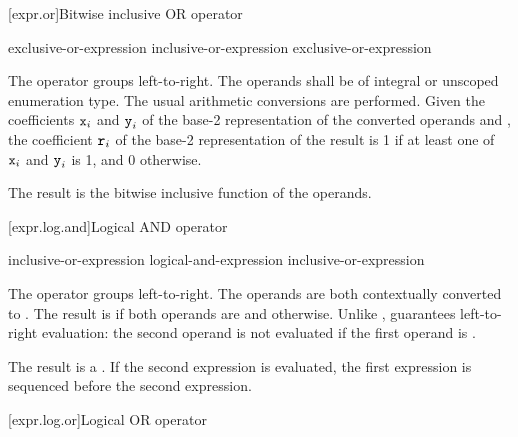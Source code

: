 [expr.or]{Bitwise inclusive OR operator}%
%
%

\begin{bnf}
\br
    exclusive-or-expression\br
    inclusive-or-expression \terminal{|} exclusive-or-expression
\end{bnf}

\pnum
The \tcode{|} operator groups left-to-right.
The operands shall be of integral or unscoped enumeration type.
The usual arithmetic conversions are performed.
Given the coefficients $\texttt{\protect x}_i$ and $\texttt{\protect y}_i$
of the base-2 representation
of the converted operands  and ,
the coefficient $\texttt{\protect r}_i$
of the base-2 representation of the result 
is 1 if at least one of $\texttt{\protect x}_i$ and $\texttt{\protect y}_i$ is 1, and 0 otherwise.
\begin{note}
The result is the bitwise inclusive  function of the operands.
\end{note}

[expr.log.and]{Logical AND operator}%
%
%
%

\begin{bnf}
\br
    inclusive-or-expression\br
    logical-and-expression \terminal{\&\&} inclusive-or-expression
\end{bnf}

\pnum
The \tcode{\&\&} operator groups left-to-right. The operands are both
contextually converted to .
The
result is  if both operands are  and
 otherwise. Unlike \tcode{\&}, \tcode{\&\&} guarantees
left-to-right evaluation: the second operand is not evaluated if the
first operand is .

\pnum
The result is a .
%
If the second expression is evaluated,
the first expression is sequenced before
the second expression.

[expr.log.or]{Logical OR operator}%
%
%
%

